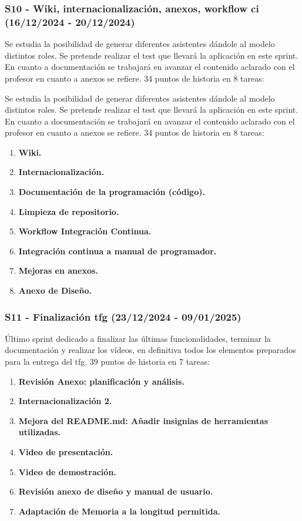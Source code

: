 \subsubsection{S10 - Wiki, internacionalización, anexos, workflow ci (16/12/2024 - 20/12/2024)}
Se estudia la posibilidad de generar diferentes asistentes dándole al modelo distintos roles. Se pretende realizar el test que llevará la aplicación en este sprint. En cuanto a documentación se trabajará en avanzar el contenido aclarado con el profesor en cuanto a anexos se refiere. 34 puntos de historia en 8 tareas:
\begin{enumerate}
Se estudia la posibilidad de generar diferentes asistentes dándole al modelo distintos roles. Se pretende realizar el test que llevará la aplicación en este sprint. En cuanto a documentación se trabajará en avanzar el contenido aclarado con el profesor en cuanto a anexos se refiere. 34 puntos de historia en 8 tareas:\begin{enumerate}
	\item \textbf{Wiki.}
	\item \textbf{Internacionalización.}
	\item \textbf{Documentación de la programación (código).}
	\item \textbf{Limpieza de repositorio.}
	\item \textbf{Workflow Integración Continua.}
	\item \textbf{Integración continua a manual de programador.}
	\item \textbf{Mejoras en anexos.}
	\item \textbf{Anexo de Diseño.}
\end{enumerate}

\subsubsection{S11 - Finalización \acrshort{tfg} (23/12/2024 - 09/01/2025)}
Último sprint dedicado a finalizar las últimas funcionalidades, terminar la documentación y realizar los vídeos, en definitiva todos los elementos preparados para la entrega del \acrfull{tfg}. 39 puntos de historia en 7 tareas:
\begin{enumerate}
	\item \textbf{Revisión Anexo: planificación y análisis.}
	\item \textbf{Internacionalización 2.}
	\item \textbf{Mejora del README.md: Añadir insignias de herramientas utilizadas.}
	\item \textbf{Video de presentación.}
	\item \textbf{Video de demostración.}
	\item \textbf{Revisión anexo de diseño y manual de usuario.}
	\item \textbf{Adaptación de Memoria a la longitud permitida.}
\end{enumerate}


\end{enumerate}
